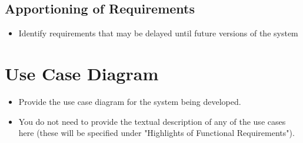 \documentclass[]{article}
\begin{document}
\subsection{Apportioning of Requirements}
\label{sub:apportioning_of_requirements}
\begin{itemize}
    \item Identify requirements that may be delayed until future versions of the system
\end{itemize}
\section{Use Case Diagram}
\label{sec:use_case_diagram}
\begin{itemize}
    \item Provide the use case diagram for the system being developed.
    \item You do not need to provide the textual description of any of the use cases here (these will be specified under "Highlights of Functional Requirements").
\end{itemize}
%
%
%
\end{document}
